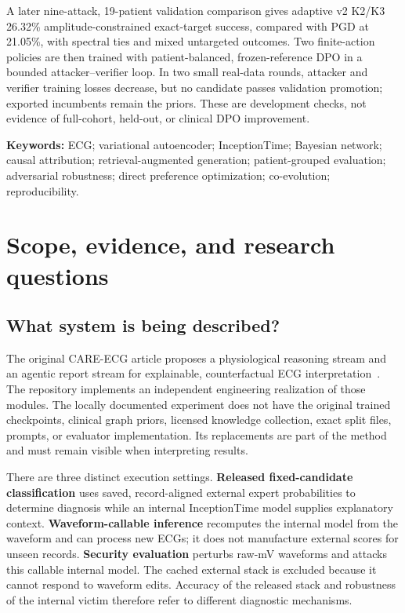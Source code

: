 \documentclass[11pt,a4paper]{article}
\begin{document}
A later nine-attack, 19-patient validation comparison gives adaptive v2 K2/K3 26.32\% amplitude-constrained exact-target success, compared with PGD at 21.05\%, with spectral ties and mixed untargeted outcomes. Two finite-action policies are then trained with patient-balanced, frozen-reference DPO in a bounded attacker--verifier loop. In two small real-data rounds, attacker and verifier training losses decrease, but no candidate passes validation promotion; exported incumbents remain the priors. These are development checks, not evidence of full-cohort, held-out, or clinical DPO improvement.

\textbf{Keywords:} ECG; variational autoencoder; InceptionTime; Bayesian network; causal attribution; retrieval-augmented generation; patient-grouped evaluation; adversarial robustness; direct preference optimization; co-evolution; reproducibility.

\clearpage
\tableofcontents
\clearpage
{}

\section{Scope, evidence, and research questions}
\label{sec:scope}
\subsection{What system is being described?}
The original CARE-ECG article proposes a physiological reasoning stream and an agentic report stream for explainable, counterfactual ECG interpretation~\cite{care}. The repository implements an independent engineering realization of those modules. The locally documented experiment does not have the original trained checkpoints, clinical graph priors, licensed knowledge collection, exact split files, prompts, or evaluator implementation. Its replacements are part of the method and must remain visible when interpreting results.

There are three distinct execution settings. \textbf{Released fixed-candidate classification} uses saved, record-aligned external expert probabilities to determine diagnosis while an internal InceptionTime model supplies explanatory context. \textbf{Waveform-callable inference} recomputes the internal model from the waveform and can process new ECGs; it does not manufacture external scores for unseen records. \textbf{Security evaluation} perturbs raw-mV waveforms and attacks this callable internal model. The cached external stack is excluded because it cannot respond to waveform edits. Accuracy of the released stack and robustness of the internal victim therefore refer to different diagnostic mechanisms.
\end{document}
